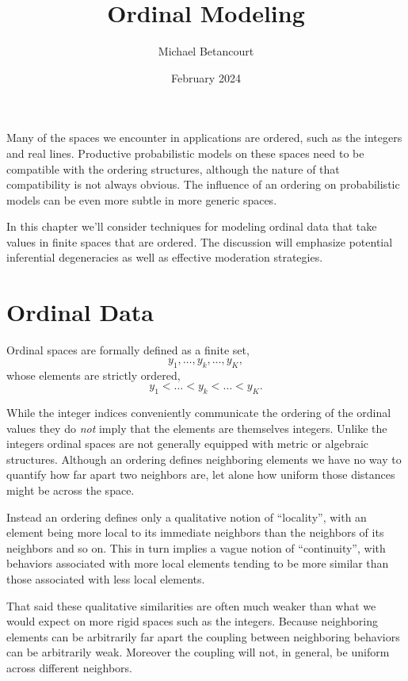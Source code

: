 \documentclass[
  letterpaper,
  DIV=11,
  numbers=noendperiod]{scrartcl}
\title{Ordinal Modeling}
\author{Michael Betancourt}
\date{February 2024}
\renewcommand*\contentsname{Table of contents}
\newcommand\contentsname{Table of contents}
\begin{document}
\maketitle

\renewcommand*\contentsname{Table of contents}
{
\hypersetup{linkcolor=}
\setcounter{tocdepth}{3}
\tableofcontents
}
Many of the spaces we encounter in applications are ordered, such as the
integers and real lines. Productive probabilistic models on these spaces
need to be compatible with the ordering structures, although the nature
of that compatibility is not always obvious. The influence of an
ordering on probabilistic models can be even more subtle in more generic
spaces.

In this chapter we'll consider techniques for modeling ordinal data that
take values in finite spaces that are ordered. The discussion will
emphasize potential inferential degeneracies as well as effective
moderation strategies.

\section{Ordinal Data}\label{ordinal-data}

Ordinal spaces are formally defined as a finite set, \[
y_{1}, \ldots, y_{k}, \ldots, y_{K},
\] whose elements are strictly ordered, \[
y_{1} < \ldots < y_{k} < \ldots < y_{K}.
\]

While the integer indices conveniently communicate the ordering of the
ordinal values they do \emph{not} imply that the elements are themselves
integers. Unlike the integers ordinal spaces are not generally equipped
with metric or algebraic structures. Although an ordering defines
neighboring elements we have no way to quantify how far apart two
neighbors are, let alone how uniform those distances might be across the
space.

Instead an ordering defines only a qualitative notion of ``locality'',
with an element being more local to its immediate neighbors than the
neighbors of its neighbors and so on. This in turn implies a vague
notion of ``continuity'', with behaviors associated with more local
elements tending to be more similar than those associated with less
local elements.

That said these qualitative similarities are often much weaker than what
we would expect on more rigid spaces such as the integers. Because
neighboring elements can be arbitrarily far apart the coupling between
neighboring behaviors can be arbitrarily weak. Moreover the coupling
will not, in general, be uniform across different neighbors.
\end{document}
